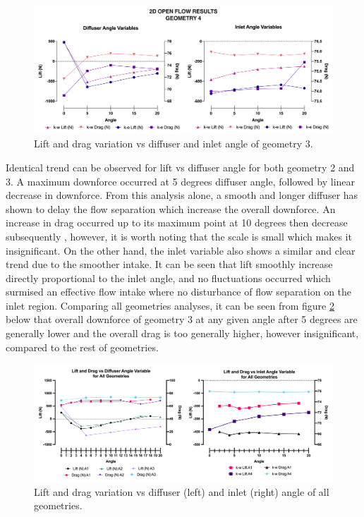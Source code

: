 \begin{figure}[htb!]
    \centering
    \includegraphics[scale=0.6]{Figures/Graph/2D_OF_A4.png}
    \caption{Lift and drag variation vs diffuser and inlet angle of geometry 3.}
    \label{fig:2D_OF_A4_results}
\end{figure}

\noindent Identical trend can be observed for lift vs diffuser angle for both geometry 2 and 3. A maximum downforce occurred at 5 degrees diffuser angle, followed by linear decrease in downforce. From this analysis alone, a smooth and longer diffuser has shown to delay the flow separation which increase the overall downforce. An increase in drag occurred up to its maximum point at 10 degrees then decrease  subsequently , however, it is worth noting that the scale is small which makes it insignificant. On the other hand, the inlet variable also shows a similar and clear trend due to the smoother intake. It can be seen that lift smoothly increase directly proportional to the inlet angle, and no fluctuations occurred which surmised  an effective flow intake where no disturbance of flow separation on the inlet region. Comparing all geometries analyses, it can be seen from figure \ref{fig:2D_OF_PLOT_COMPARE_ALL} below that overall downforce of geometry 3 at any given angle after 5 degrees are generally lower and the overall drag is too generally higher, however insignificant, compared to the rest of geometries.

\begin{figure}[htb!]
    \centering
    \includegraphics[scale=0.9]{Figures/2D_OF/2D_OF_PLOT_COMPARE_ALL.png}
    \caption{Lift and drag variation vs diffuser (left) and inlet (right) angle of all geometries.}
    \label{fig:2D_OF_PLOT_COMPARE_ALL}
\end{figure}

